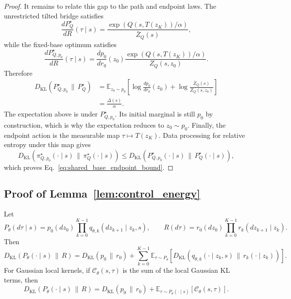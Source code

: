 \documentclass[11pt]{article}
\begin{document}
\begin{proof}
It remains to relate this gap to the path and endpoint laws. The unrestricted tilted bridge satisfies
\begin{equation}
  \frac{
    dP_Q^\star
  }{
    dR
  }(\tau\mid s)
  =
  \frac{
    \exp(Q(s,T(z_K))/\alpha)
  }{
    \bar Z_Q(s)
  },
\end{equation}
while the fixed-base optimum satisfies
\begin{equation}
  \frac{
    dP_{Q,p_0}^\star
  }{
    dR
  }(\tau\mid s)
  =
  \frac{
    dp_0
  }{
    dr_0
  }(z_0)
  \frac{
    \exp(Q(s,T(z_K))/\alpha)
  }{
    Z_Q(s,z_0)
  }.
\end{equation}
Therefore
\begin{align}
  D_{\mathrm{KL}}
  \left(
    P_{Q,p_0}^\star
    \,\|\,P_Q^\star
  \right)
  &=
  \mathbb E_{z_0\sim p_0}
  \left[
    \log
    \frac{
      dp_0
    }{
      dr_0
    }(z_0)
    +
    \log
    \frac{
      \bar Z_Q(s)
    }{
      Z_Q(s,z_0)
    }
  \right]
  \nonumber\\
  &=
  \frac{
    \Delta(s)
  }{
    \alpha
  }.
\end{align}
The expectation above is under $P_{Q,p_0}^\star$. Its initial marginal is still $p_0$ by construction, which is why the expectation reduces to $z_0\sim p_0$. Finally, the endpoint action is the measurable map $\tau\mapsto T(z_K)$. Data processing for relative entropy under this map gives
\begin{equation}
  D_{\mathrm{KL}}
  \left(
    \pi_{Q,p_0}^\star(\cdot\mid s)
    \,\|\,\pi_Q^\star(\cdot\mid s)
  \right)
  \le
  D_{\mathrm{KL}}
  \left(
    P_{Q,p_0}^\star(\cdot\mid s)
    \,\|\,P_Q^\star(\cdot\mid s)
  \right),
\end{equation}
which proves Eq.~\eqref{eq:shared_base_endpoint_bound}.
\end{proof}

\subsection{Proof of Lemma~\ref{lem:control_energy}}
\label{app:proof_control_energy}

\begin{restatement}
Let
\[
  P_\theta(d\tau\mid s)
  =
  p_0(dz_0)
  \prod_{k=0}^{K-1}
  q_{\theta,k}(dz_{k+1}\mid z_k,s),
  \qquad
  R(d\tau)
  =
  r_0(dz_0)
  \prod_{k=0}^{K-1}
  r_k(dz_{k+1}\mid z_k).
\]
Then
\[
  D_{\mathrm{KL}}
  \left(
    P_\theta(\cdot\mid s)
    \,\|\,R
  \right)
  =
  D_{\mathrm{KL}}
  \left(
    p_0
    \,\|\,
    r_0
  \right)
  +
  \sum_{k=0}^{K-1}
  \mathbb E_{\tau\sim P_\theta}
  \left[
    D_{\mathrm{KL}}
    \left(
      q_{\theta,k}(\cdot\mid z_k,s)
      \,\|\,r_k(\cdot\mid z_k)
    \right)
  \right].
\]
For Gaussian local kernels, if $\mathcal C_\theta(s,\tau)$ is the sum of the local Gaussian KL terms, then
\[
  D_{\mathrm{KL}}
  \left(
    P_\theta(\cdot\mid s)
    \,\|\,R
  \right)
  =
  D_{\mathrm{KL}}
  \left(
    p_0
    \,\|\,
    r_0
  \right)
  +
  \mathbb E_{\tau\sim P_\theta(\cdot\mid s)}
  \left[
    \mathcal C_\theta(s,\tau)
  \right].
\]

\end{restatement}
\end{document}
